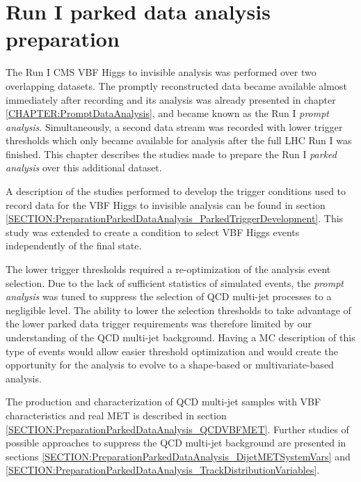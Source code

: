 \chapter{Run I parked data analysis preparation}
\label{CHAPTER:PreparationParkedDataAnalysis}



The Run I \gls{CMS} \gls{VBF} Higgs to invisible analysis was performed over two overlapping datasets. The promptly reconstructed data became available almost immediately after recording and its analysis was already presented in chapter \ref{CHAPTER:PromptDataAnalysis}, and became known as the Run I \textit{prompt analysis}. Simultaneously, a second data stream was recorded with lower trigger thresholds which only became available for analysis after the full \gls{LHC} Run I was finished. This chapter describes the studies made to prepare the Run I \textit{parked analysis} over this additional dataset. 

A description of the studies performed to develop the trigger conditions used to record data for the \gls{VBF} Higgs to invisible analysis can be found in section \ref{SECTION:PreparationParkedDataAnalysis_ParkedTriggerDevelopment}. This study was extended to create a condition to select \gls{VBF} Higgs events independently of the final state.

The lower trigger thresholds required a re-optimization of the analysis event selection. Due to the lack of sufficient statistics of simulated events, the \textit{prompt analysis} was tuned to suppress the selection of \gls{QCD} multi-jet processes to a negligible level. The ability to lower the selection thresholds to take advantage of the lower parked data trigger requirements was therefore  limited by our understanding of the \gls{QCD} multi-jet background. Having a \gls{MC} description of this type of events would allow easier threshold optimization and would create the opportunity for the analysis to evolve to a shape-based or multivariate-based analysis.

The production and characterization of \gls{QCD} multi-jet samples with \gls{VBF} characteristics and real \gls{MET} is described in section \ref{SECTION:PreparationParkedDataAnalysis_QCDVBFMET}. Further studies of possible approaches to suppress the \gls{QCD} multi-jet background are presented in sections \ref{SECTION:PreparationParkedDataAnalysis_DijetMETSystemVars} and \ref{SECTION:PreparationParkedDataAnalysis_TrackDistributionVariables}.


